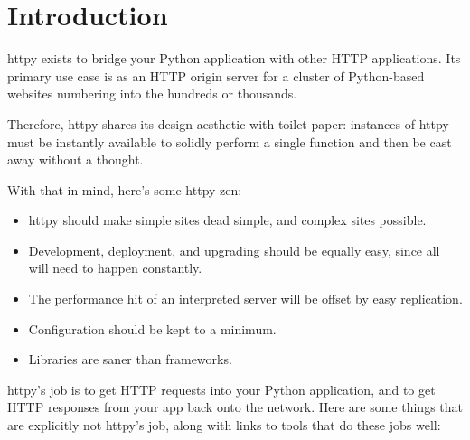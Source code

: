 \chapter{Introduction}

httpy exists to bridge your Python application with other HTTP applications. Its
primary use case is as an HTTP origin server for a cluster of Python-based
websites numbering into the hundreds or thousands.

Therefore, httpy shares its design aesthetic with toilet paper: instances of
httpy must be instantly available to solidly perform a single function and then
be cast away without a thought.

With that in mind, here's some httpy zen:

\begin{itemize}
\item
httpy should make simple sites dead simple, and complex sites possible.
\item
Development, deployment, and upgrading should be equally easy, since all will need to happen constantly.
\item
The performance hit of an interpreted server will be offset by easy replication.
\item
Configuration should be kept to a minimum.
\item
Libraries are saner than frameworks.
\end{itemize}

httpy's job is to get HTTP requests into your Python application, and to get HTTP responses from your app back onto the network. Here are some things that are explicitly not httpy's job, along with links to tools that do these jobs well:

